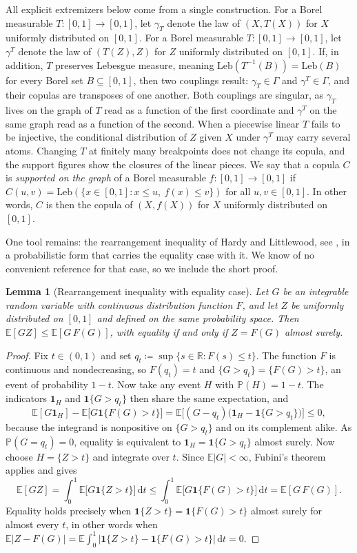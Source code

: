 \documentclass[11pt,a4paper]{article}
\newtheorem{lemma}[theorem]{Lemma}
\theoremstyle{remark}
\newcommand{\E}{\mathbb{E}}
\newcommand{\Prob}{\mathbb{P}}
\newcommand{\R}{\mathbb{R}}
\newcommand{\de}{\,\mathrm{d}}
\newcommand{\1}{\mathbf{1}}
\newcommand{\Gam}{\Gamma}
\begin{document}
All explicit extremizers below come from a single construction.
For a Borel measurable $T:[0,1]\to[0,1]$, let $\gamma_T$ denote the law of $(X,T(X))$ for $X$ uniformly distributed on $[0,1]$.
For a Borel measurable $T:[0,1]\to[0,1]$, let $\gamma^T$ denote the law of $(T(Z),Z)$ for $Z$ uniformly distributed on $[0,1]$.
If, in addition, $T$ preserves Lebesgue measure, meaning $\mathrm{Leb}(T^{-1}(B))=\mathrm{Leb}(B)$ for every Borel set $B\subseteq[0,1]$, then two couplings result: $\gamma_T\in\Gam$ and $\gamma^T\in\Gam$, and their copulas are transposes of one another.
Both couplings are singular, as $\gamma_T$ lives on the graph of $T$ read as a function of the first coordinate and $\gamma^T$ on the same graph read as a function of the second.
When a piecewise linear $T$ fails to be injective, the conditional distribution of $Z$ given $X$ under $\gamma^T$ may carry several atoms.
Changing $T$ at finitely many breakpoints does not change its copula, and the support figures show the closures of the linear pieces.
We say that a copula $C$ is \emph{supported on the graph} of a Borel measurable $f:[0,1]\to[0,1]$ if $C(u,v)=\mathrm{Leb}(\{x\in[0,1]:x\le u,\ f(x)\le v\})$ for all $u,v\in[0,1]$.
In other words, $C$ is then the copula of $(X,f(X))$ for $X$ uniformly distributed on $[0,1]$.

One tool remains: the rearrangement inequality of Hardy and Littlewood, see \cite[Ch.~X]{hardy1952inequalities}, in a probabilistic form that carries the equality case with it.
We know of no convenient reference for that case, so we include the short proof.

\begin{lemma}[Rearrangement inequality with equality case]
\label{lem:rearrangement}
Let $G$ be an integrable random variable with continuous distribution function $F$, and let $Z$ be uniformly distributed on $[0,1]$ and defined on the same probability space.
Then $\E[GZ]\le\E[G\,F(G)]$, with equality if and only if $Z=F(G)$ almost surely.
\end{lemma}

\begin{proof}
Fix $t\in(0,1)$ and set $q_t\coloneqq\sup\{s\in\R:F(s)\le t\}$.
The function $F$ is continuous and nondecreasing, so $F(q_t)=t$ and $\{G>q_t\}=\{F(G)>t\}$, an event of probability $1-t$.
Now take any event $H$ with $\Prob(H)=1-t$.
The indicators $\1_H$ and $\1\{G>q_t\}$ then share the same expectation, and
\[
  \E[G\1_H]-\E\bigl[G\1\{F(G)>t\}\bigr]
  =\E\bigl[(G-q_t)\bigl(\1_H-\1\{G>q_t\}\bigr)\bigr]
  \le0,
\]
because the integrand is nonpositive on $\{G>q_t\}$ and on its complement alike.
As $\Prob(G=q_t)=0$, equality is equivalent to $\1_H=\1\{G>q_t\}$ almost surely.
Now choose $H=\{Z>t\}$ and integrate over $t$.
Since $\E|G|<\infty$, Fubini's theorem applies and gives
\[
  \E[GZ]=\int_0^1\E\bigl[G\1\{Z>t\}\bigr]\de t
  \le\int_0^1\E\bigl[G\1\{F(G)>t\}\bigr]\de t
  =\E[G\,F(G)].
\]
Equality holds precisely when $\1\{Z>t\}=\1\{F(G)>t\}$ almost surely for almost every $t$, in other words when $\E|Z-F(G)|=\E\int_0^1|\1\{Z>t\}-\1\{F(G)>t\}|\de t=0$.
\end{proof}
\end{document}
